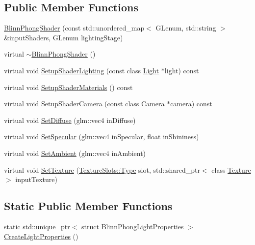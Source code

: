 \subsection*{Public Member Functions}
\begin{DoxyCompactItemize}
\item 
\hyperlink{class_blinn_phong_shader_a2a13c983ffcc8d95ffe1a431bb2b1fb6}{Blinn\+Phong\+Shader} (const std\+::unordered\+\_\+map$<$ G\+Lenum, std\+::string $>$ \&input\+Shaders, G\+Lenum lighting\+Stage)
\item 
virtual \hyperlink{class_blinn_phong_shader_a5d7a46de957e0676ed4ceb00f7399a39}{$\sim$\+Blinn\+Phong\+Shader} ()
\item 
virtual void \hyperlink{class_blinn_phong_shader_a9e4a7358ce59f7fa77ed872eb15eabe7}{Setup\+Shader\+Lighting} (const class \hyperlink{class_light}{Light} $\ast$light) const 
\item 
virtual void \hyperlink{class_blinn_phong_shader_ade1dfa6ceb0b2650b2ca3b849ee875ac}{Setup\+Shader\+Materials} () const 
\item 
virtual void \hyperlink{class_blinn_phong_shader_a0e3e2e1d5981f173a72e82d0ef4d643d}{Setup\+Shader\+Camera} (const class \hyperlink{class_camera}{Camera} $\ast$camera) const 
\item 
virtual void \hyperlink{class_blinn_phong_shader_a610957f435f1ef817e7d2c4350e55181}{Set\+Diffuse} (glm\+::vec4 in\+Diffuse)
\item 
virtual void \hyperlink{class_blinn_phong_shader_a6567423da36050cc1567919707e8be72}{Set\+Specular} (glm\+::vec4 in\+Specular, float in\+Shininess)
\item 
virtual void \hyperlink{class_blinn_phong_shader_a0f8c1c478525dd662922597ea7d9c4ac}{Set\+Ambient} (glm\+::vec4 in\+Ambient)
\item 
virtual void \hyperlink{class_blinn_phong_shader_aa9c8908b300ce1451887945fb961d3b2}{Set\+Texture} (\hyperlink{struct_blinn_phong_shader_1_1_texture_slots_a98940b49ba855ee47d61a6243c05c34d}{Texture\+Slots\+::\+Type} slot, std\+::shared\+\_\+ptr$<$ class \hyperlink{class_texture}{Texture} $>$ input\+Texture)
\end{DoxyCompactItemize}
\subsection*{Static Public Member Functions}
\begin{DoxyCompactItemize}
\item 
static std\+::unique\+\_\+ptr$<$ struct \hyperlink{struct_blinn_phong_light_properties}{Blinn\+Phong\+Light\+Properties} $>$ \hyperlink{class_blinn_phong_shader_a44f9413ef4896886b67b12c8809e5cd9}{Create\+Light\+Properties} ()
\end{DoxyCompactItemize}
